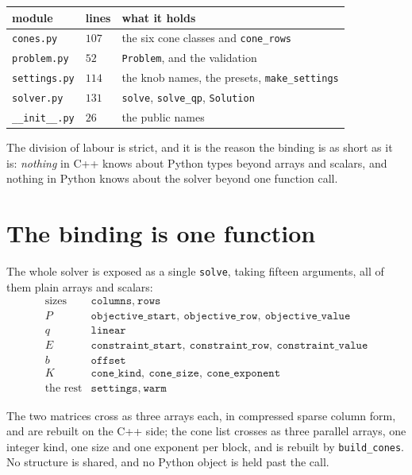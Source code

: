 \documentclass[a4paper,11pt]{book}
\theoremstyle{plain}
\theoremstyle{definition}
\theoremstyle{remark}
\numberwithin{equation}{chapter}
\numberwithin{algorithm}{chapter}
\begin{document}
	\begin{table}[H]
		\centering\small
		\begin{tabular}{lll}
			\toprule
			module & lines & what it holds\\
			\midrule
			\texttt{cones.py} & $107$ & the six cone classes and \texttt{cone\_rows}\\
			\texttt{problem.py} & $52$ & \texttt{Problem}, and the validation\\
			\texttt{settings.py} & $114$ & the knob names, the presets, \texttt{make\_settings}\\
			\texttt{solver.py} & $131$ & \texttt{solve}, \texttt{solve\_qp},
			\texttt{Solution}\\
			\texttt{\_\_init\_\_.py} & $26$ & the public names\\
			\bottomrule
		\end{tabular}
	\end{table}

	The division of labour is strict, and it is the reason the binding is as short
	as it is: \emph{nothing} in C++ knows about Python types beyond arrays and
	scalars, and nothing in Python knows about the solver beyond one function
	call.

	\section{The binding is one function}

	The whole solver is exposed as a single \texttt{solve}, taking fifteen
	arguments, all of them plain arrays and scalars:
	\[
	\begin{array}{ll}
		\text{sizes} & \texttt{columns},\ \texttt{rows}\\
		P & \texttt{objective\_start},\ \texttt{objective\_row},\
		\texttt{objective\_value}\\
		q & \texttt{linear}\\
		E & \texttt{constraint\_start},\ \texttt{constraint\_row},\
		\texttt{constraint\_value}\\
		b & \texttt{offset}\\
		K & \texttt{cone\_kind},\ \texttt{cone\_size},\ \texttt{cone\_exponent}\\
		\text{the rest} & \texttt{settings},\ \texttt{warm}
	\end{array}
	\]

	The two matrices cross as three arrays each, in compressed sparse column form,
	and are rebuilt on the C++ side; the cone list crosses as three parallel
	arrays, one integer kind, one size and one exponent per block, and is rebuilt
	by \texttt{build\_cones}. No structure is shared, and no Python object is held
	past the call.
\end{document}

